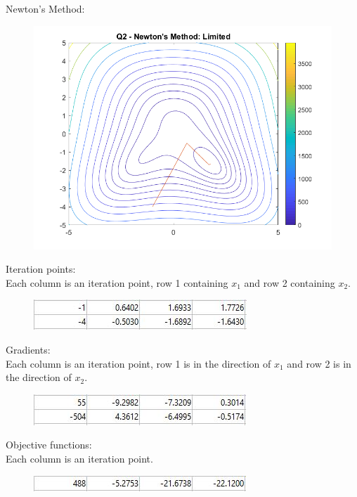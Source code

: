 \documentclass[10pt,a4paper]{article}
\begin{document}
\newpage
Newton's Method:
\begin{figure} [H]
	\centering
	\includegraphics[width=0.7\linewidth]{q2nl}
\end{figure}
Iteration points: \\
Each column is an iteration point, row 1 containing \(x_1\) and row 2 containing \(x_2\).
\begin{figure} [H]
	\centering
	\includegraphics[width=0.7\linewidth]{q2nlp}
\end{figure}
Gradients: \\
Each column is an iteration point, row 1 is in the direction of \(x_1\) and row 2 is in the direction of \(x_2\).
\begin{figure} [H]
	\centering
	\includegraphics[width=0.7\linewidth]{q2nlg}
\end{figure}
Objective functions: \\
Each column is an iteration point.
\begin{figure} [H]
	\centering
	\includegraphics[width=0.7\linewidth]{q2nlf}
\end{figure}
\end{document}
